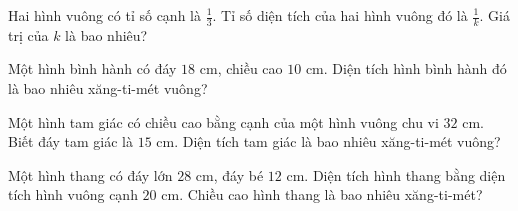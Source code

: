 \begin{ex}
  Hai hình vuông có tỉ số cạnh là $\frac{1}{3}$. Tỉ số diện tích của hai hình vuông đó là $\frac{1}{k}$. Giá trị của $k$ là bao nhiêu?
\end{ex}

\begin{ex}
  Một hình bình hành có đáy $18\text{ cm}$, chiều cao $10\text{ cm}$. Diện tích hình bình hành đó là bao nhiêu xăng-ti-mét vuông?
\end{ex}

\begin{ex}
  Một hình tam giác có chiều cao bằng cạnh của một hình vuông chu vi $32\text{ cm}$. Biết đáy tam giác là $15\text{ cm}$. Diện tích tam giác là bao nhiêu xăng-ti-mét vuông?
\end{ex}

\begin{ex}
  Một hình thang có đáy lớn $28\text{ cm}$, đáy bé $12\text{ cm}$. Diện tích hình thang bằng diện tích hình vuông cạnh $20\text{ cm}$. Chiều cao hình thang là bao nhiêu xăng-ti-mét?
\end{ex}
